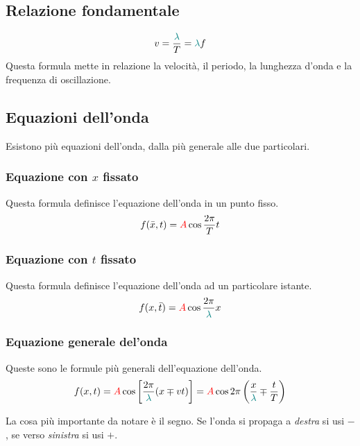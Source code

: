 \subsection{Relazione fondamentale}
\begin{equation*}
v = \frac{\mathcolor{teal}{\lambda}}{T} = \mathcolor{teal}{\lambda}f
\end{equation*}
Questa formula mette in relazione la velocità, il periodo, la lunghezza d'onda e la frequenza
di oscillazione.

\subsection{Equazioni dell'onda}
Esistono più equazioni dell'onda, dalla più generale alle due particolari.

\subsubsection{Equazione con $x$ fissato}
Questa formula definisce l'equazione dell'onda in un punto fisso.
\begin{equation*}
f(\bar{x}, t) = \mathcolor{red}{A}\cos\frac{2\pi}{T}t
\end{equation*}

\subsubsection{Equazione con $t$ fissato}
Questa formula definisce l'equazione dell'onda ad un particolare istante.
\begin{equation*}
f(x, \bar{t}) = \mathcolor{red}{A} \cos\frac{2\pi}{\mathcolor{teal}{\lambda}}x
\end{equation*}

\subsubsection{Equazione generale del'onda}
Queste sono le formule più generali dell'equazione dell'onda.
\begin{equation*}
f(x, t) = \mathcolor{red}{A}\cos\left[\frac{2\pi}{\mathcolor{teal}{\lambda}}(x\mp vt)\right] =
\mathcolor{red}{A}\cos2\pi\left(\frac{x}{\mathcolor{teal}{\lambda}}\mp\frac{t}{T}\right)
\end{equation*}

La cosa più importante da notare è il segno. Se l'onda si propaga a \emph{destra} si usi $-$, se
verso \emph{sinistra} si usi $+$.

